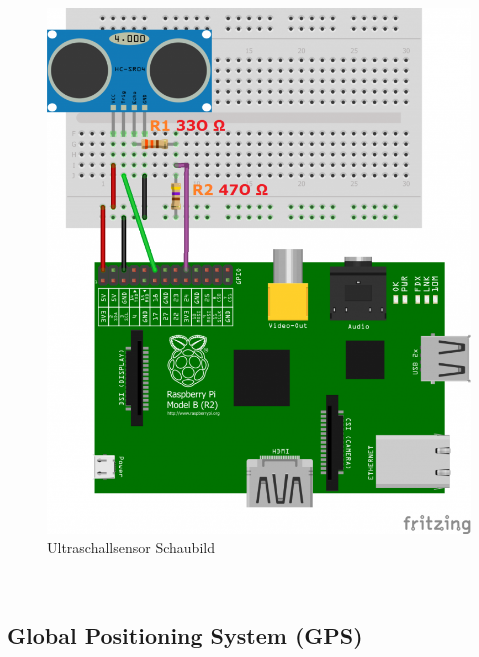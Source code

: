 \begin{figure}[h]
	\centering
	\includegraphics[scale=0.3]{"Grafiken/Ultraschallsensor.png"}
	\caption{Ultraschallsensor Schaubild}
	\label{fig:meine-grafik}
\end{figure}
\\



\subsection{Global Positioning System (GPS)}

